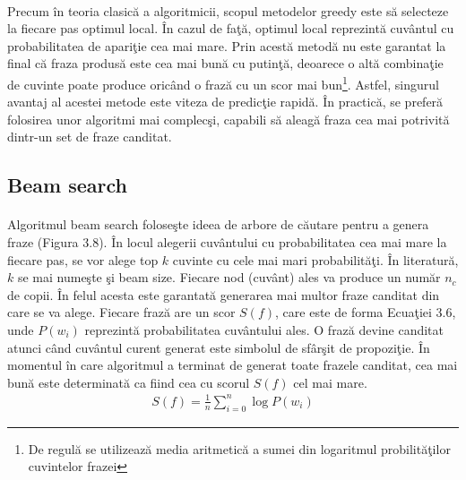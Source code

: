 \paragraph{}
Precum \^ in teoria clasic\u a a algoritmicii, scopul metodelor greedy este s\u a selecteze la fiecare pas optimul local. \^ In cazul de fa\c t\u a, optimul local reprezint\u a cuv\^ antul cu probabilitatea de apari\c tie cea mai mare. Prin acest\u a metod\u a nu este garantat la final c\u a fraza produs\u a este cea mai bun\u a cu putin\c t\u a, deoarece o alt\u a combina\c tie de cuvinte poate produce oric\^ and o fraz\u a cu un scor mai bun\footnote{De regul\u a se utilizeaz\u a media aritmetic\u a a sumei din logaritmul probilit\u a\c tilor cuvintelor frazei}. Astfel, singurul avantaj al acestei metode este viteza de predic\c tie rapid\u a. \^ In practic\u a, se prefer\u a folosirea unor algoritmi mai complec\c si, capabili s\u a aleag\u a fraza cea mai potrivit\u a dintr-un set de fraze canditat.

\subsection{Beam search}

\paragraph{}
Algoritmul beam search \cite{norvig1992paradigms} folose\c ste ideea de arbore de c\u autare pentru a genera fraze (Figura 3.8). \^ In locul alegerii cuv\^ antului cu probabilitatea cea mai mare la fiecare pas, se vor alege top \(k\) cuvinte cu cele mai mari probabilit\u a\c ti. \^ In literatur\u a, \(k\) se mai nume\c ste \c si beam size. Fiecare nod (cuv\^ ant) ales va produce un num\u ar \(n_c\) de copii. \^ In felul acesta este garantat\u a generarea mai multor fraze canditat din care se va alege. Fiecare fraz\u a are un scor \(S(f)\), care este de forma Ecua\c tiei 3.6, unde \(P(w_{i})\) reprezint\u a probabilitatea cuv\^ antului ales. O fraz\u a devine canditat atunci c\^ and cuv\^ antul curent generat este simbolul de sf\^ ar\c sit de propozi\c tie. \^ In momentul \^ in care algoritmul a terminat de generat toate frazele canditat, cea mai bun\u a este determinat\u a ca fiind cea cu scorul \(S(f)\) cel mai mare.\\

\begin{equation}
\begin{split}
S(f) = \frac{1}{n} \sum_{i=0}^{n} \log P(w_{i})
\end{split}
\end{equation}

